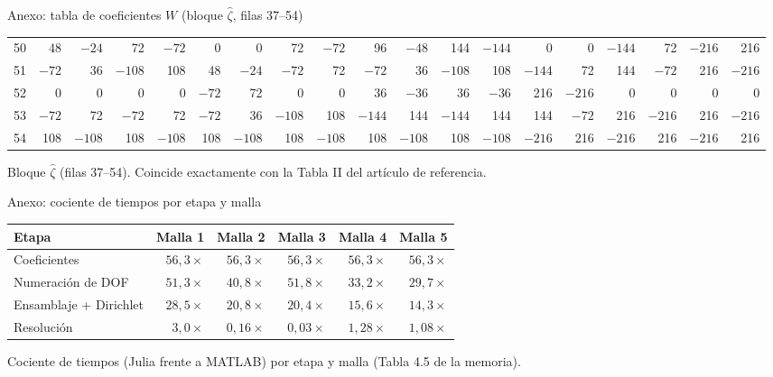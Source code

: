 \documentclass{beamer}
\begin{document}
\begin{frame}{Anexo: tabla de coeficientes $W$ (bloque $\hat\zeta$, filas 37--54)}
\begin{center}
{\begin{tabular}{r|rrrrrrrrrrrrrrrrrr}
      \tiny 50 & 48 & $-24$ & 72 & $-72$ & 0 & 0 & 72 & $-72$ & 96 & $-48$ & 144 & $-144$ & 0 & 0 & $-144$ & 72 & $-216$ & 216\\
      \tiny 51 & $-72$ & 36 & $-108$ & 108 & 48 & $-24$ & $-72$ & 72 & $-72$ & 36 & $-108$ & 108 & $-144$ & 72 & 144 & $-72$ & 216 & $-216$\\
      \tiny 52 & 0 & 0 & 0 & 0 & $-72$ & 72 & 0 & 0 & 36 & $-36$ & 36 & $-36$ & 216 & $-216$ & 0 & 0 & 0 & 0\\
      \tiny 53 & $-72$ & 72 & $-72$ & 72 & $-72$ & 36 & $-108$ & 108 & $-144$ & 144 & $-144$ & 144 & 144 & $-72$ & 216 & $-216$ & 216 & $-216$\\
      \tiny 54 & 108 & $-108$ & 108 & $-108$ & 108 & $-108$ & 108 & $-108$ & 108 & $-108$ & 108 & $-108$ & $-216$ & 216 & $-216$ & 216 & $-216$ & 216\\
    \end{tabular}}
  \end{center}
  \vspace{-0.35cm}
  {\scriptsize Bloque $\hat\zeta$ (filas 37--54). Coincide exactamente con la
  Tabla II del artículo de referencia.}
\end{frame}

\begin{frame}{Anexo: cociente de tiempos por etapa y malla}
  \vspace{-0.35cm}
  \begin{center}
    \footnotesize
    \begin{tabular}{lrrrrr}
      \hline
      \textbf{Etapa} & \textbf{Malla 1} & \textbf{Malla 2} & \textbf{Malla 3} & \textbf{Malla 4} & \textbf{Malla 5}\\
      \hline
      Coeficientes            & $56{,}3\times$ & $56{,}3\times$ & $56{,}3\times$ & $56{,}3\times$ & $56{,}3\times$\\
      Numeración de DOF       & $51{,}3\times$ & $40{,}8\times$ & $51{,}8\times$ & $33{,}2\times$ & $29{,}7\times$\\
      Ensamblaje + Dirichlet  & $28{,}5\times$ & $20{,}8\times$ & $20{,}4\times$ & $15{,}6\times$ & $14{,}3\times$\\
      Resolución              & $3{,}0\times$  & $0{,}16\times$ & $0{,}03\times$ & $1{,}28\times$ & $1{,}08\times$\\
      \hline
    \end{tabular}
  \end{center}
  \vspace{0.1cm}
  {\scriptsize Cociente de tiempos (Julia frente a MATLAB) por etapa y malla
  (Tabla 4.5 de la memoria).}
\end{frame}
\end{document}
